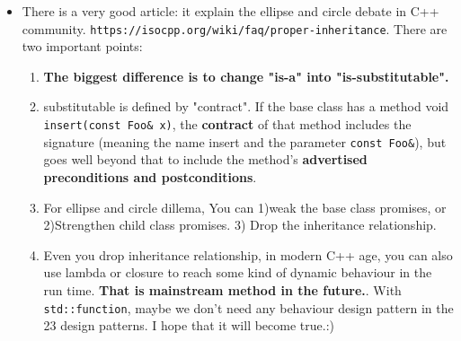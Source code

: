 \documentclass[a4paper,11pt,twoside]{book}
\begin{document}
\begin{itemize}
    \item There is a very good article: it explain the ellipse and circle debate in C++ community. \verb=https://isocpp.org/wiki/faq/proper-inheritance=. There are two important points:

        \begin{enumerate}
            \item \textbf{The biggest difference is to change "is-a" into "is-substitutable". }

            \item substitutable is defined by "contract". If the base class has a method void \texttt{insert(const Foo\& x)}, the \textbf{contract} of that method includes the signature (meaning the name insert and the parameter \texttt{const Foo\&}), but goes well beyond that to include the method’s \textbf{advertised preconditions and postconditions}. 

            \item For ellipse and circle dillema, You can 1)weak the base class promises, or 2)Strengthen child class promises. 3) Drop the inheritance relationship. 

            \item Even you drop inheritance relationship, in modern C++ age, you can also use lambda or closure to reach some kind of dynamic behaviour in the run time. \textbf{That is mainstream method in the future.}. With \texttt{std::function}, maybe we don't need any behaviour design pattern in the 23 design patterns. I hope that it will become true.:)
        \end{enumerate}

\end{itemize}
\end{document}
